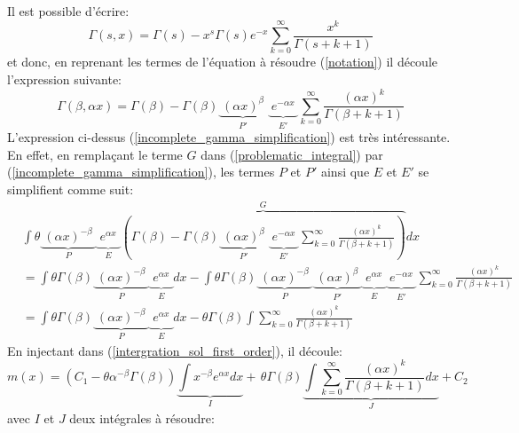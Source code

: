 Il est possible d'écrire:
\[
    \Gamma(s,x) = \Gamma(s)-x^s\Gamma(s)e^{-x}\sum_{k=0}^{\infty} \frac{x^k}{\Gamma(s+k+1)}
\]
et donc, en reprenant les termes de l'équation à résoudre (\ref{notation}) il découle l'expression suivante: 
\begin{equation}\label{incomplete_gamma_simplification}
    \Gamma(\beta, \alpha x) = \Gamma(\beta)-\Gamma(\beta)\underbrace{\phantom{|}{(\alpha x)}^\beta\phantom{|}}_{P'} \underbrace{\phantom{|}e^{-\alpha x}\phantom{|}}_{E'}\sum_{k=0}^{\infty} \frac{{(\alpha x)}^k}{\Gamma(\beta+k+1)}
\end{equation}
L'expression ci-dessus (\ref{incomplete_gamma_simplification}) est très intéressante. En effet, en remplaçant le terme $G$ dans (\ref{problematic_integral}) par (\ref{incomplete_gamma_simplification}), les termes $P$ et $P'$ ainsi que $E$ et $E'$ se simplifient comme suit:
\[
    \begin{aligned}
        &\int\theta \underbrace{\phantom{|}{(\alpha x)}^{-\beta}\phantom{|}}_{P}\underbrace{\phantom{|}e^{\alpha x}\phantom{|}}_{E}\overbrace{\left(\Gamma(\beta)-\Gamma(\beta)\underbrace{\phantom{|}{(\alpha x)}^\beta\phantom{|}}_{P'} \underbrace{\phantom{|}e^{-\alpha x}\phantom{|}}_{E'}\sum_{k=0}^{\infty} \frac{{(\alpha x)}^k}{\Gamma(\beta+k+1)}\right)}^{G}dx \\
        &= \int\theta\Gamma(\beta)\underbrace{\phantom{|}{(\alpha x)}^{-\beta}\phantom{|}}_{P}\underbrace{\phantom{|}e^{\alpha x}\phantom{|}}_{E}dx-\int\theta\Gamma(\beta)\underbrace{\phantom{|}{(\alpha x)}^{-\beta}\phantom{|}}_{P}\underbrace{\phantom{|}{(\alpha x)}^\beta\phantom{|}}_{P'}\underbrace{\phantom{|}e^{\alpha x}\phantom{|}}_{E} \underbrace{\phantom{|}e^{-\alpha x}\phantom{|}}_{E'}\sum_{k=0}^{\infty} \frac{{(\alpha x)}^k}{\Gamma(\beta+k+1)} \\
        &= \int\theta\Gamma(\beta)\underbrace{\phantom{|}{(\alpha x)}^{-\beta}\phantom{|}}_{P}\underbrace{\phantom{|}e^{\alpha x}\phantom{|}}_{E}dx-\theta\Gamma(\beta)\int\sum_{k=0}^{\infty} \frac{{(\alpha x)}^k}{\Gamma(\beta+k+1)}
    \end{aligned}
\]
En injectant dans (\ref{intergration_sol_first_order}), il découle: 
\[
m(x)=(C_1-\theta\alpha^{-\beta}\Gamma(\beta))\underbrace{\int x^{-\beta}e^{\alpha x}dx}_I + \,\theta\Gamma(\beta) \underbrace{\int\sum_{k=0}^{\infty} \frac{{(\alpha x)}^k}{\Gamma(\beta+k+1)}dx}_J + C_2
\]
avec $I$ et $J$ deux intégrales à résoudre: 
